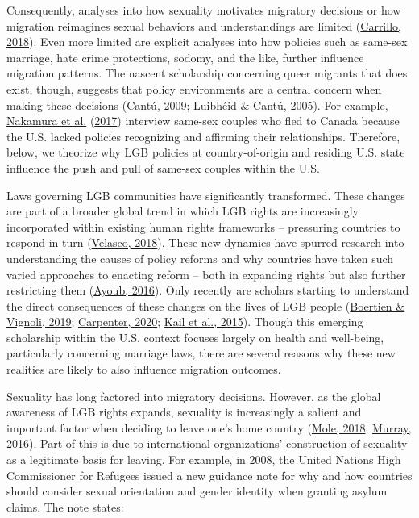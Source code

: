 \documentclass[
  11pt,
]{article}
\begin{document}
Consequently, analyses into how sexuality motivates migratory decisions or how migration reimagines sexual behaviors and understandings are limited (\protect\hyperlink{ref-carrillo_2018}{Carrillo, 2018}). Even more limited are explicit analyses into how policies such as same-sex marriage, hate crime protections, sodomy, and the like, further influence migration patterns. The nascent scholarship concerning queer migrants that does exist, though, suggests that policy environments are a central concern when making these decisions (\protect\hyperlink{ref-cantu_2009}{Cantú, 2009}; \protect\hyperlink{ref-luibheid_2005}{Luibhéid \& Cantú, 2005}). For example, \protect\hyperlink{ref-nakamura_2017}{Nakamura et al.} (\protect\hyperlink{ref-nakamura_2017}{2017}) interview same-sex couples who fled to Canada because the U.S. lacked policies recognizing and affirming their relationships. Therefore, below, we theorize why LGB policies at country-of-origin and residing U.S. state influence the push and pull of same-sex couples within the U.S.

Laws governing LGB communities have significantly transformed. These changes are part of a broader global trend in which LGB rights are increasingly incorporated within existing human rights frameworks -- pressuring countries to respond in turn (\protect\hyperlink{ref-velasco_2018}{Velasco, 2018}). These new dynamics have spurred research into understanding the causes of policy reforms and why countries have taken such varied approaches to enacting reform -- both in expanding rights but also further restricting them (\protect\hyperlink{ref-ayoub_2016}{Ayoub, 2016}). Only recently are scholars starting to understand the direct consequences of these changes on the lives of LGB people (\protect\hyperlink{ref-boertien_2019}{Boertien \& Vignoli, 2019}; \protect\hyperlink{ref-carpenter_2020}{Carpenter, 2020}; \protect\hyperlink{ref-kail_2015}{Kail et al., 2015}). Though this emerging scholarship within the U.S. context focuses largely on health and well-being, particularly concerning marriage laws, there are several reasons why these new realities are likely to also influence migration outcomes.

Sexuality has long factored into migratory decisions. However, as the global awareness of LGB rights expands, sexuality is increasingly a salient and important factor when deciding to leave one's home country (\protect\hyperlink{ref-mole_2018a}{Mole, 2018}; \protect\hyperlink{ref-murray_2016}{Murray, 2016}). Part of this is due to international organizations' construction of sexuality as a legitimate basis for leaving. For example, in 2008, the United Nations High Commissioner for Refugees issued a new guidance note for why and how countries should consider sexual orientation and gender identity when granting asylum claims. The note states:
\end{document}
